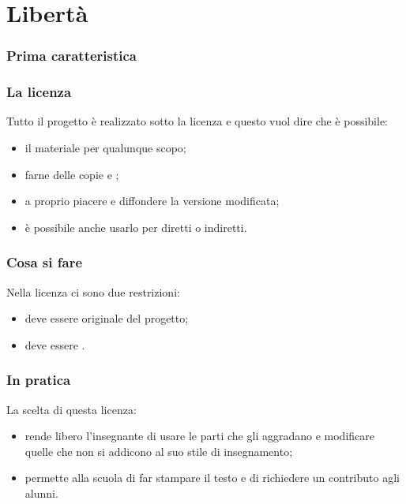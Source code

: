 \documentclass{beamer} %
\begin{document}
\section{Libertà}


\begin{frame}\frametitle{Prima caratteristica}

\begin{center}  \end{center}

\end{frame}


\begin{frame}\frametitle{La licenza}

Tutto il progetto è realizzato sotto la licenza  
e questo vuol dire 
che è possibile:
\begin{itemize} [<+->]
\item {} il materiale per qualunque scopo;
\item farne delle copie e ;
\item {} a proprio piacere e 
diffondere la versione modificata;
\item è possibile anche usarlo per  
diretti o indiretti.
\end{itemize}

\end{frame}


\begin{frame}\frametitle{Cosa si  fare}

Nella licenza ci sono due restrizioni:

\bigskip
\begin{itemize} [<+->]
\item deve essere  originale del progetto;
\item deve essere .
\end{itemize}

\end{frame}


\begin{frame}\frametitle{In pratica}

La scelta di questa licenza:

\bigskip
\begin{itemize} [<+->]
\item rende libero l'insegnante di usare le parti che 
gli aggradano e modificare quelle che non si addicono al suo stile di 
insegnamento;
\item permette alla scuola di far stampare il testo e di richiedere un 
contributo agli alunni.
\end{itemize}

\end{frame}
\end{document}
